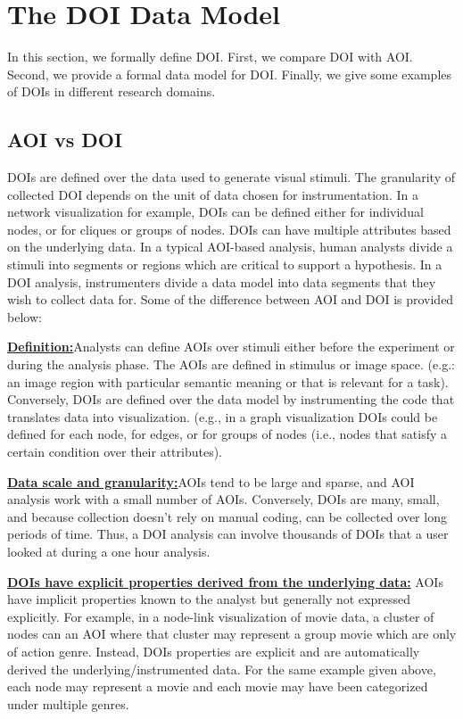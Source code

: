 \section{The DOI Data Model}
\label{sec:DataModel}
In this section, we formally define DOI. First, we compare DOI with AOI. Second, we provide a formal data model for DOI. Finally, we give some examples of DOIs in different research domains. 

\subsection{AOI vs DOI}
\label{sec:AOIvDOI}

DOIs are defined over the data used to generate visual stimuli. The granularity of collected DOI depends on the unit of data chosen for instrumentation. In a network visualization for example, DOIs can be defined either for individual nodes, or for cliques or groups of nodes. DOIs can have multiple attributes based on the underlying data. 
In a typical AOI-based analysis, human analysts divide a stimuli into segments or regions which are critical to support a hypothesis. In a DOI analysis, instrumenters divide a data model into data segments that they wish to collect data for. Some of the difference between AOI and DOI is provided below: 

\textbf{\underline{Definition:}}Analysts can define AOIs over stimuli either before the experiment or during the analysis phase. The AOIs are defined in stimulus or image space. (e.g.: an image region with particular semantic meaning or that is relevant for a task). Conversely, DOIs are defined over the data model by instrumenting the code that translates data into visualization.   (e.g., in a graph visualization DOIs could be defined for each node, for edges, or for groups of nodes (i.e., nodes that satisfy a certain condition over their attributes).


\textbf{\underline{Data scale and granularity:}}AOIs tend to be large and sparse, and AOI analysis work with a small number of AOIs. Conversely, DOIs are many, small, and because collection doesn't rely on manual coding, can be collected over long periods of time. Thus, a DOI analysis can involve thousands of DOIs that a user looked at during a one hour analysis.

\textbf{\uline{DOIs have explicit properties derived from the underlying data:}} AOIs have implicit properties known to the analyst but generally not expressed explicitly. For example, in a node-link visualization of movie data, a cluster of nodes can an AOI where that cluster may represent a group movie which are only of action genre. Instead, DOIs properties are explicit and are automatically derived the underlying/instrumented data. For the same example given above, each node may represent a movie and each movie may have been categorized under multiple genres. 

